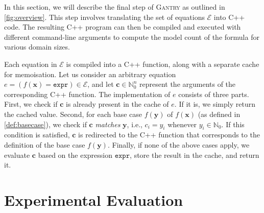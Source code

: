 \documentclass[a4paper,UKenglish,cleveref, autoref, thm-restate]{lipics-v2021}
\newcommand{\expr}{\mathtt{expr}}
\newcommand{\Cranetwo}{\textsc{Gantry}}
\begin{document}
In this section, we will describe the final step of \Cranetwo{} as outlined in
\cref{fig:overview}. This step involves translating the set of equations
$\mathcal{E}$ into C++ code. The resulting C++ program can then be compiled and
executed with different command-line arguments to compute the model count of the
formula for various domain sizes.

Each equation in $\mathcal{E}$ is compiled into a C++ function, along with a
separate cache for memoisation. Let us consider an arbitrary equation
$e = (f(\mathbf{x}) = \expr{}) \in \mathcal{E}$, and let
$\mathbf{c} \in \mathbb{N}_{0}^{n}$ represent the arguments of the corresponding
C++ function. The implementation of $e$ consists of three parts. First, we check
if $\mathbf{c}$ is already present in the cache of $e$. If it is, we simply
return the cached value. Second, for each base case $f(\mathbf{y})$ of
$f(\mathbf{x})$ (as defined in \cref{def:basecase}), we check if $\mathbf{c}$
\emph{matches} $\mathbf{y}$, i.e., $c_{i} = y_{i}$ whenever
$y_{i} \in \mathbb{N}_{0}$. If this condition is satisfied, $\mathbf{c}$ is
redirected to the C++ function that corresponds to the definition of the base
case $f(\mathbf{y})$. Finally, if none of the above cases apply, we evaluate
$\mathbf{c}$ based on the expression $\expr{}$, store the result in the cache,
and return it.

\section{Experimental Evaluation}\label{sec:experiments}






\end{document}
